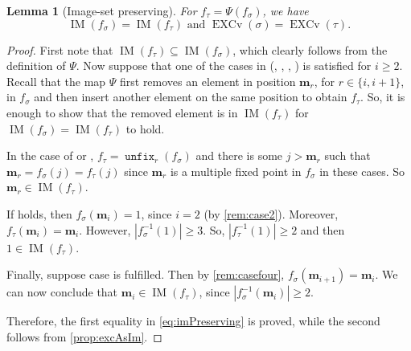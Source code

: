 \documentclass[reqno]{amsart}
\newtheorem{lemma}[theorem]{Lemma}
\theoremstyle{definition}
\newcommand{\fretherD}{\Psi}
\newcommand{\img}{\mathbf{m}}
\DeclareMathOperator{\EXCv}{EXCv}
\DeclareMathOperator{\supp}{IM}
\DeclareMathOperator{\unfixMap}{\mathtt{unfix}}
\begin{document}
\begin{lemma}[Image-set preserving]\label{lem:imPreserving}
For $f_{\tau}=\fretherD(f_{\sigma})$, we have 
\begin{equation}\label{eq:imPreserving}
\supp(f_{\sigma}) = \supp(f_{\tau}) \text{ and }
\EXCv(\sigma) = \EXCv(\tau). 
\end{equation}
\end{lemma}
\begin{proof}
	First note that $\supp(f_{\tau})\subseteq \supp(f_{\sigma})$, which clearly follows from 
	the definition of $\fretherD$. Now suppose that one of the cases in (\caseOne[i], \caseTwo[i], \caseThree[i], \caseFour[i]) 
	is satisfied for $i\geq 2$. Recall that the map $\fretherD$ first removes an element in position $\img_r$, 
	for $r\in\{i, i+1\}$, in $f_\sigma$ and then insert another element on the same position to 
	obtain $f_\tau$. So, it is enough to show that the 
	removed element is in $\supp(f_\tau)$ for $\supp(f_{\sigma}) = \supp(f_{\tau})$ to hold.
\medskip

In the case of \caseOne[i] or \caseThree[i], $f_\tau=\unfixMap_r(f_\sigma)$ and there is some $j>\img_r$ such 
that $\img_r=f_{\sigma}(j)=f_{\tau}(j)$ since $\img_r$ is a multiple fixed point in $f_\sigma$ in these cases. So $\img_r\in \supp(f_{\tau})$.
\medskip

If \caseTwo[i] holds, then
$f_{\sigma}(\img_i)=1$, since $i=2$ (by \cref{rem:case2}). Moreover, $f_\tau(\img_i)=\img_i$. However, $|f^{-1}_\sigma(1)|\geq 3$. So, $|f^{-1}_\tau(1)|\geq 2$ and then $1\in \supp(f_{\tau})$. 
\medskip

Finally, suppose case \caseFour[i] is fulfilled. Then by \cref{rem:casefour}, $f_{\sigma}(\img_{i+1})=\img_i$. We can now conclude that $\img_i\in \supp(f_{\tau})$, since $|f^{-1}_\sigma(\img_i)|\geq 2$. 
\medskip

Therefore, the first equality in \eqref{eq:imPreserving} is proved, while the second follows from \cref{prop:excAsIm}. 
\end{proof}

 
 
\end{document}
